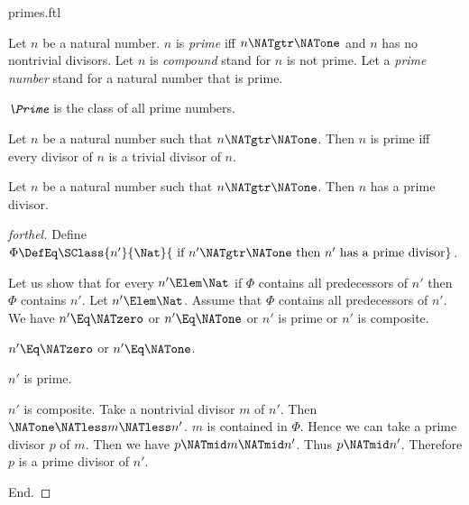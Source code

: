 \documentclass{stex}
\begin{document}
\begin{smodule}{primes.ftl}

\begin{definition}[forthel,for={prime,compound,prime number}]
  Let $n$ be a natural number.
  $n$ is \emph{prime} iff $n \NATgtr \NATone$ and $n$ has no nontrivial divisors.
  Let $n$ is \emph{compound} stand for $n$ is not prime.
  Let a \emph{prime number} stand for a natural number that is prime.
\end{definition}

\begin{definition}[forthel,for=Prime]
  $\emph{\Prime}$ is the class of all prime numbers.
\end{definition}

\begin{proposition}[forthel]
  Let $n$ be a natural number such that $n \NATgtr \NATone$.
  Then $n$ is prime iff every divisor of $n$ is a trivial divisor of $n$.
\end{proposition}

\begin{proposition}[forthel]
  Let $n$ be a natural number such that $n \NATgtr \NATone$.
  Then $n$ has a prime divisor.
\end{proposition}
\begin{proof}[forthel]
  Define $\Phi \DefEq \SClass{n'}{\Nat}{\text{ if }n' \NATgtr \NATone\text{ then }n'\text{ has a prime divisor}}$.

  Let us show that for every $n' \Elem \Nat$ if $\Phi$ contains all
  predecessors of $n'$ then $\Phi$ contains $n'$.
    Let $n' \Elem \Nat$.
    Assume that $\Phi$ contains all predecessors of $n'$.
    We have $n' \Eq \NATzero$ or $n' \Eq \NATone$ or $n'$ is prime or $n'$ is composite.

    \begin{case}{$n' \Eq \NATzero$ or $n' \Eq \NATone$.} \end{case}

    \begin{case}{$n'$ is prime.} \end{case}

    \begin{case}{$n'$ is composite.}
      Take a nontrivial divisor $m$ of $n'$.
      Then $\NATone \NATless m \NATless n'$.
      $m$ is contained in $\Phi$.
      Hence we can take a prime divisor $p$ of $m$.
      Then we have $p \NATmid m \NATmid n'$.
      Thus $p \NATmid n'$.
      Therefore $p$ is a prime divisor of $n'$.
    \end{case}
  End.


\end{proof}
\end{smodule}
\end{document}
